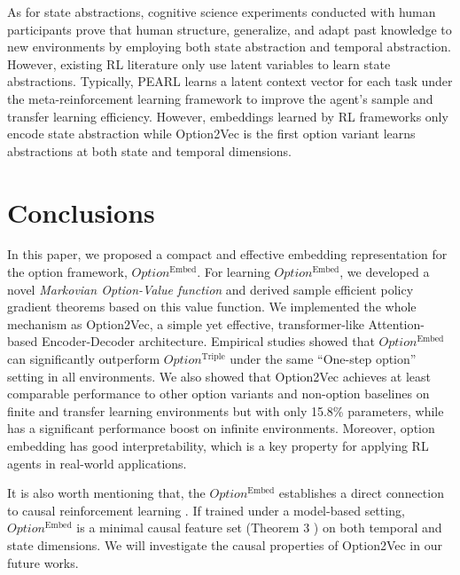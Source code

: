 \documentclass[10pt,journal,compsoc]{IEEEtran}
\renewcommand{\cite}{\citep}
\begin{document}
As for state abstractions, cognitive science experiments
\cite{xia2020temporal} conducted with human participants prove
that human structure, generalize, and adapt past knowledge to new
environments by employing both state abstraction and temporal
abstraction. However, existing RL literature
\cite{hausman2018learning,li2017infogail,tirumala2019exploiting}
only use latent variables to learn state abstractions. Typically,
PEARL \cite{rakelly2019efficient} learns a latent context vector
for each task under the meta-reinforcement learning framework to
improve the agent's sample and transfer learning efficiency.
However, embeddings learned by RL frameworks only encode state
abstraction while Option2Vec is the first option variant learns
abstractions at both state and temporal dimensions.
\section{Conclusions}
\label{sec:conclusion}

In this paper, we proposed a compact and effective embedding representation for the option framework, $Option^{\textrm{Embed}}$.
For learning $Option^{\textrm{Embed}}$, we developed a novel \emph{Markovian Option-Value function} and derived sample efficient policy gradient theorems based on this
value function. We implemented the whole mechanism as Option2Vec, a simple yet effective, transformer-like Attention-based Encoder-Decoder
architecture. Empirical studies showed that $Option^{\textrm{Embed}}$ can significantly outperform $Option^{\textrm{Triple}}$ under the same ``One-step option'' setting in all environments. We also showed that Option2Vec achieves at least comparable performance to other option variants and non-option baselines on finite and transfer learning environments but with only 15.8\% parameters, while has a significant performance boost on infinite environments.
Moreover, option embedding has good interpretability, which is a key property for applying RL agents in real-world applications.

It is also worth mentioning that, the $Option^{\textrm{Embed}}$
establishes a direct connection to causal reinforcement learning
\cite{kolobov2012discovering,perez2020generalized}. If trained
under a model-based setting, $Option^{\textrm{Embed}}$ is a minimal causal
feature set (Theorem 3 \cite{zhang2020learning}) on both temporal
and state dimensions. We will investigate the causal properties of Option2Vec in our future works.
\end{document}
